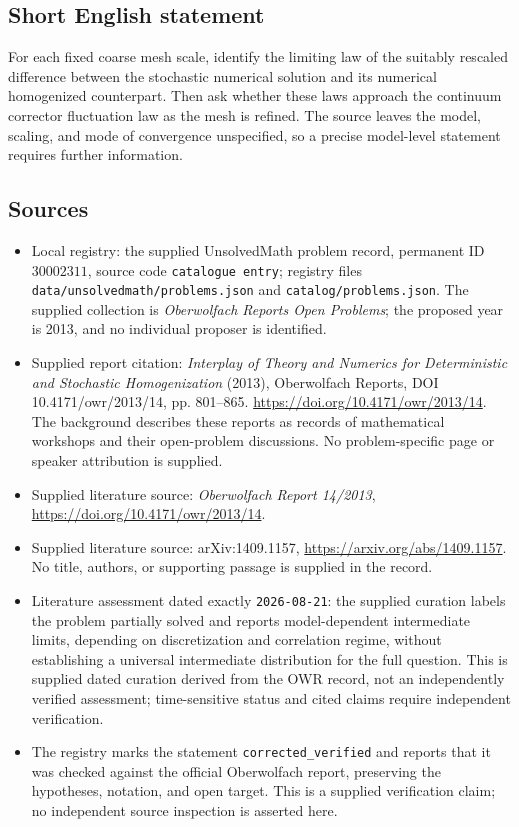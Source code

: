 \documentclass[11pt]{article}
\begin{document}
\subsection{Short English statement}
For each fixed coarse mesh scale, identify the limiting law of the suitably rescaled difference between the stochastic numerical solution and its numerical homogenized counterpart. Then ask whether these laws approach the continuum corrector fluctuation law as the mesh is refined. The source leaves the model, scaling, and mode of convergence unspecified, so a precise model-level statement requires further information.
\subsection{Sources}
\begin{itemize}
\item Local registry: the supplied UnsolvedMath problem record, permanent ID \(30002311\), source code \texttt{catalogue entry}; registry files \texttt{data/unsolvedmath/problems.json} and \texttt{catalog/problems.json}. The supplied collection is \emph{Oberwolfach Reports Open Problems}; the proposed year is 2013, and no individual proposer is identified.
\item Supplied report citation: \emph{Interplay of Theory and Numerics for Deterministic and Stochastic Homogenization} (2013), Oberwolfach Reports, DOI 10.4171/owr/2013/14, pp. 801--865. \url{https://doi.org/10.4171/owr/2013/14}. The background describes these reports as records of mathematical workshops and their open-problem discussions. No problem-specific page or speaker attribution is supplied.
\item Supplied literature source: \emph{Oberwolfach Report 14/2013}, \url{https://doi.org/10.4171/owr/2013/14}.
\item Supplied literature source: arXiv:1409.1157, \url{https://arxiv.org/abs/1409.1157}. No title, authors, or supporting passage is supplied in the record.
\item Literature assessment dated exactly \texttt{2026-08-21}: the supplied curation labels the problem partially solved and reports model-dependent intermediate limits, depending on discretization and correlation regime, without establishing a universal intermediate distribution for the full question. This is supplied dated curation derived from the OWR record, not an independently verified assessment; time-sensitive status and cited claims require independent verification.
\item The registry marks the statement \texttt{corrected\_verified} and reports that it was checked against the official Oberwolfach report, preserving the hypotheses, notation, and open target. This is a supplied verification claim; no independent source inspection is asserted here.
\end{itemize}
\end{document}
